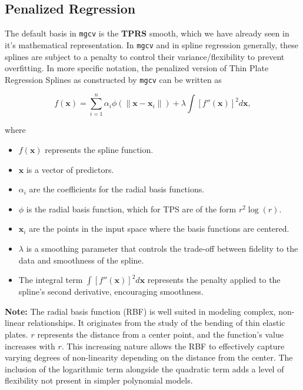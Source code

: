 \documentclass[12pt, twoside,hidelinks]{article}
\theoremstyle{definition}
\numberwithin{equation}{section}
\begin{document}
\subsection{Penalized Regression}\label{sec:smooth:penreg}

The default basis in \texttt{mgcv} is the \textbf{TPRS} smooth, which we have already seen in it's mathematical representation. In \texttt{mgcv} and in spline regression generally, these splines are subject to a penalty to control their variance/flexibility to prevent overfitting. In more specific notation, the penalized version of Thin Plate Regression Splines as constructed by \texttt{mgcv} can be written as 

\begin{equation}
    f(\boldsymbol{x}) = \sum_{i=1}^{n} \alpha_i \phi(\|\boldsymbol{x} - \boldsymbol{x}_i\|) + \lambda \int [f''(\boldsymbol{x})]^2 d\boldsymbol{x},
    \label{eq:penalized_tprs}
\end{equation}

where 

\begin{itemize}
    \item \( f(\boldsymbol{x}) \) represents the spline function.
    \item \( \boldsymbol{x} \) is a vector of predictors.
    \item \( \alpha_i \) are the coefficients for the radial basis functions.
    \item \( \phi \) is the radial basis function, which for TPS are of the form \( r^2 \log(r) \).
    \item \( \boldsymbol{x}_i \) are the points in the input space where the basis functions are centered.
    \item \( \lambda \) is a smoothing parameter that controls the trade-off between fidelity to the data and smoothness of the spline.
    \item The integral term \( \int [f''(\boldsymbol{x})]^2 d\boldsymbol{x} \) represents the penalty applied to the spline's second derivative, encouraging smoothness.
\end{itemize}

\textbf{Note:} The radial basis function (RBF) is well suited in modeling complex, non-linear relationships. It originates from the study of the bending of thin elastic plates. \( r \) represents the distance from a center point, and the function's value increases with \( r \). This increasing nature allows the RBF to effectively capture varying degrees of non-linearity depending on the distance from the center. The inclusion of the logarithmic term alongside the quadratic term adds a level of flexibility not present in simpler polynomial models.
\newline
\end{document}
